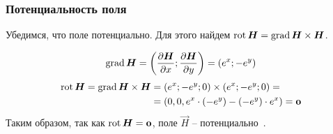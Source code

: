 \begin{frame}\frametitle{Потенциальность поля}
Убедимся, что поле потенциально.
Для этого найдем \( \rot \vec H = \grad \vec H \times \vec H \).

\begin{equation*}
  \grad \vec H = 
  \left( \frac{\partial \vec H}{\partial x};  \frac{\partial \vec H}{\partial y}\right) =
  \left( e^x; -e^{y} \right)
\end{equation*}
\begin{align*}
  \rot \vec H = \grad \vec H \times \vec H &= (e^x; -e^y; 0) \times (e^x; -e^y; 0) = \\
                                           &= (0, 0, e^x \cdot (-e^y) - (-e^y) \cdot e^x) = \vec 0
\end{align*}
Таким образом, так как \(\rot \vec H = \vec 0\), поле \(\vec H\) -- потенциально~\cite{korn}.

\end{frame}   
